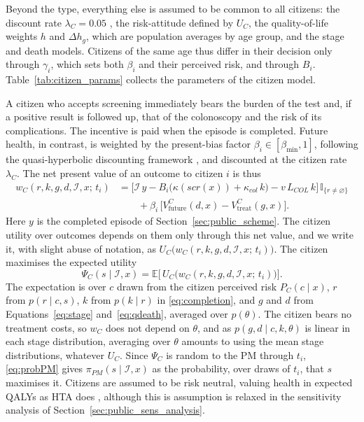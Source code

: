 \documentclass[12pt]{article}
\begin{document}
Beyond the type, everything else is assumed to be common to all citizens: the discount rate $\lambda_C = 0.05$ \citep{mahboub2014stated}, the risk-attitude defined by $U_C$, the quality-of-life weights $h$ and $\Delta h_g$, which are population averages by age group, and the stage and death models. Citizens of the same age thus differ in their decision only through $\gamma_i$, which sets both $\beta_i$ and their perceived risk, and through $B_i$. Table~\ref{tab:citizen_params} collects the parameters of the citizen model.

A citizen who accepts screening immediately bears the burden of the test and, if a positive result is followed up, that of the colonoscopy and the risk of its complications. The incentive is paid when the episode is completed. Future health, in contrast, is weighted by the present-bias factor $\beta_i \in [\beta_{\min},1]$, following the quasi-hyperbolic discounting framework \citep{laibson1997golden}, and discounted at the citizen rate $\lambda_C$. The net present value of an outcome to citizen $i$ is thus
\begin{align}\label{eq:wcit}
w_C(r,k,g,d,\mathcal{I},x;\, t_i) &=
  \Big[\mathcal{I}\,y - B_i\big(\kappa(scr(x)) + \kappa_{col}\,k\big) - v\,L_{COL}\,k\Big]\,\mathbb{I}_{\{r\neq\varnothing\}}
  \nonumber \\
  & \qquad + \beta_i\, \big[V^{C}_{\text{future}}(d,x) - V^{C}_{\text{treat}}(g,x)\big].
\end{align}
Here $y$ is the completed episode of Section~\ref{sec:public_scheme}. The citizen utility over outcomes depends on them only through this net value, and we write it, with slight abuse of notation, as $U_C\big(w_C(r,k,g,d,\mathcal{I},x;\, t_i)\big)$. The citizen maximises the expected utility
\begin{equation}\label{eq:eucit}
\Psi_C(s \mid \mathcal{I}, x) = \mathbb{E}\big[\,U_C\big(w_C(r,k,g,d,\mathcal{I},x;\, t_i)\big)\big].
\end{equation}
The expectation is over $c$ drawn from the citizen perceived risk $P_C(c \mid x)$, $r$ from $p(r \mid c, s)$, $k$ from $p(k \mid r)$ in \eqref{eq:completion}, and $g$ and $d$ from Equations~\eqref{eq:stage} and~\eqref{eq:qdeath}, averaged over $p(\theta)$.
The citizen bears no treatment costs, so $w_C$ does not depend on $\theta$, and as $p(g, d \mid c, k, \theta)$ is linear in each stage distribution, averaging over $\theta$ amounts to using the mean stage distributions, whatever $U_C$. Since $\Psi_C$ is random to the PM through $t_i$, \eqref{eq:probPM} gives $\pi_{PM}(s \mid \mathcal{I}, x)$ as the probability, over draws of $t_i$, that $s$ maximises it. Citizens are assumed to be risk neutral, valuing health in expected QALYs as HTA does \citep{pliskin1980utility, bleichrodt1997characterizing}, although this is assumption is relaxed in the sensitivity analysis of Section~\ref{sec:public_sens_analysis}.
\end{document}
